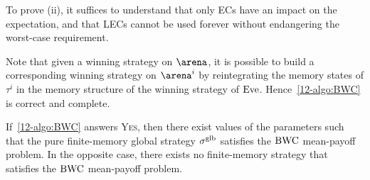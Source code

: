 To prove (ii), it suffices to understand that only ECs have an impact on the expectation, and that LECs cannot be used forever without endangering the worst-case requirement.

Note that given a winning strategy on $\arena$, it is possible to build a corresponding winning strategy on $\arena^{i}$ by reintegrating the memory states of $\tau^i$ in the memory structure of the winning strategy of $\text{Eve}$. Hence~\cref{12-algo:BWC} is correct and complete.

\begin{theorem}
\label{12-thm:bwcCorrectAndComplete}
If~\cref{12-algo:BWC} answers \textsc{Yes}, then there exist values of the parameters such that the pure finite-memory global strategy $\sigma^{\text{glb}}$ satisfies the $\text{BWC}$ mean-payoff problem. In the opposite case, there exists no finite-memory strategy that satisfies the $\text{BWC}$ mean-payoff problem.
\end{theorem}


